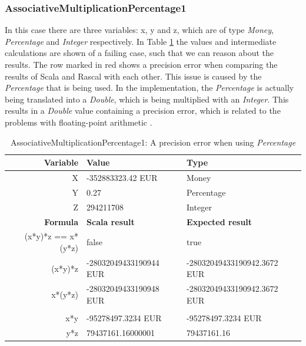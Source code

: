 \subsubsection{AssociativeMultiplicationPercentage1}
In this case there are three variables: x, y and z, which are of type
\textit{Money}, \textit{Percentage} and \textit{Integer} respectively. In Table
\ref{ch4_init_check_AssociativeMultiplicationPercentage1} the values and
intermediate calculations are shown of a failing case, such that we can reason
about the results. The row marked in red shows a precision error when comparing
the results of Scala and Rascal with each other. This issue is caused by the
\textit{Percentage} that is being used. In the implementation, the
\textit{Percentage} is actually being translated into a \textit{Double}, which
is being multiplied with an \textit{Integer}. This results in a \textit{Double}
value containing a precision error, which is related to the problems with
floating-point arithmetic \cite{goldberg1991every}.
\FloatBarrier
\begin{table}[!ht]
\centering
\begin{tabular}{rll}
\hline
\textbf{Variable}  & \textbf{Value}         & \textbf{Type}               \\ \hline
X                  & -352883323.42 EUR      & Money                       \\
Y                  & 0.27                   & Percentage                  \\
Z                  & 294211708              & Integer                     \\ \hline
\textbf{Formula}   & \textbf{Scala result}  & \textbf{Expected result}    \\ \hline
(x*y)*z == x*(y*z) & false                  & true                        \\
(x*y)*z            & -28032049433190944 EUR & -28032049433190942.3672 EUR \\
x*(y*z)            & -28032049433190948 EUR & -28032049433190942.3672 EUR \\
                   &                        &                             \\
x*y                & -95278497.3234 EUR     & -95278497.3234 EUR          \\
y*z                & 79437161.16000001      & 79437161.16                 \\ \hline
\end{tabular}
\caption{AssociativeMultiplicationPercentage1: A precision error when using \textit{Percentage}}
\label{ch4_init_check_AssociativeMultiplicationPercentage1}
\end{table}
